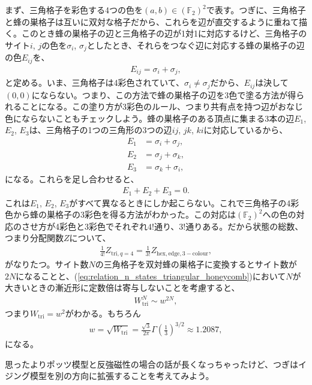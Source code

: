 \documentclass[paper=b5j,fontsize=12Q,jafontsize=12Q,baselineskip=21Q]{jlreq}
\begin{document}
\begin{refsection}
まず、三角格子を彩色する4つの色を$(a,b)\in(\mathbb F_2)^2$で表す。つぎに、三角格子と蜂の巣格子は互いに双対な格子だから、これらを辺が直交するように重ねて描く。このとき蜂の巣格子の辺と三角格子の辺が1対1に対応するけど、三角格子のサイト$i$, $j$の色を$\sigma_i$, $\sigma_j$としたとき、それらをつなぐ辺に対応する蜂の巣格子の辺の色$E_{ij}$を、
\begin{align}
  E_{ij} = \sigma_i + \sigma_j,
\end{align}
と定める。いま、三角格子は4彩色されていて、$\sigma_i\ne\sigma_j$だから、$E_{ij}$は決して$(0,0)$にならない。つまり、この方法で蜂の巣格子の辺を3色で塗る方法が得られることになる。この塗り方が3彩色のルール、つまり共有点を持つ辺がおなじ色にならないこともチェックしよう。蜂の巣格子のある頂点に集まる3本の辺$E_1$, $E_2$, $E_3$は、三角格子の1つの三角形の3つの辺$ij$, $jk$, $ki$に対応しているから、
\begin{align}
  E_1 &= \sigma_i + \sigma_j,\\
  E_2 &= \sigma_j + \sigma_k,\\
  E_3 &= \sigma_k + \sigma_i,
\end{align}
になる。これらを足し合わせると、
\begin{align}
  E_1+E_2+E_3=0.
\end{align}
これは$E_1$, $E_2$, $E_3$がすべて異なるときにしか起こらない。これで三角格子の4彩色から蜂の巣格子の3彩色を得る方法がわかった。この対応は$(\mathbb F_2)^2$への色の対応のさせ方が4彩色と3彩色でそれぞれ$4!$通り、$3!$通りある。だから状態の総数、つまり分配関数$Z$について、
\begin{align}
  \frac1{4!}Z_{\mathrm{tri},q=4}=\frac1{3!}Z_{\mathrm{hex, edge, 3-colour}},\label{eq:relation_n_states_triangular_honeycomb}
\end{align}
がなりたつ。サイト数$N$の三角格子を双対蜂の巣格子に変換するとサイト数が$2N$になることと、(\ref{eq:relation_n_states_triangular_honeycomb})において$N$が大きいときの漸近形に定数倍は寄与しないことを考慮すると、
\begin{align}
  W_{\mathrm{tri}}^N \sim w^{2N},
\end{align}
つまり$W_{\mathrm{tri}}=w^2$がわかる。もちろん
\begin{align}
  w=\sqrt{W_{\mathrm{tri}}} = \frac{\sqrt{3}}{2\pi} \Gamma\left(\frac13\right)^{3/2} \approx 1.2087,
\end{align}
になる。

思ったよりポッツ模型と反強磁性の場合の話が長くなっちゃったけど、つぎはイジング模型を別の方向に拡張することを考えてみよう。


\end{refsection}
\end{document}
